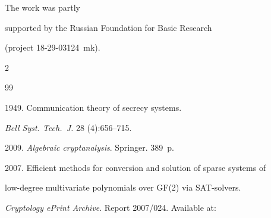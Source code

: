 \Ack


\noindent


The work was partly


supported by the Russian Foundation for Basic Research 


(project 18-29-03124~mk).













  \begin{multicols}{2}





\renewcommand{\bibname}{\protect\rmfamily References}







{\small\frenchspacing


 {%




 \begin{thebibliography}{99}


 


 \vspace*{-2pt}


 




 1949. Communication theory of secrecy systems.


\textit{Bell Syst. Tech.~J.} 28 (4):656--715.




 2009. \textit{Algebraic cryptanalysis}. Springer. 389~p.






2007. Efficient methods for conversion and solution of sparse systems of 


low-degree multivariate polynomials over GF(2) via SAT-solvers. 


\textit{Cryptology ePrint Archive}. Report 2007/024. Available at: 



\end{thebibliography}}}
\end{multicols}
